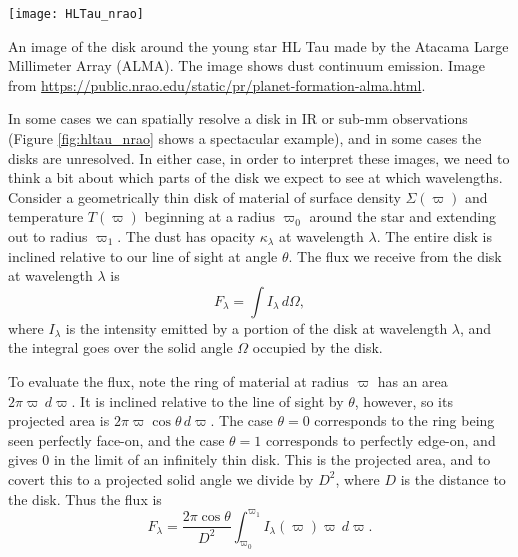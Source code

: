 \begin{marginfigure}
\texttt{[image: HLTau\_nrao]}
\caption[ALMA image of the disk around HL Tau]{
\label{fig:hltau_nrao}
An image of the disk around the young star HL Tau made by the Atacama Large Millimeter Array (ALMA). The image shows dust continuum emission. Image from \url{https://public.nrao.edu/static/pr/planet-formation-alma.html}.
}
\end{marginfigure}

In some cases we can spatially resolve a disk in IR or sub-mm observations (Figure \ref{fig:hltau_nrao} shows a spectacular example), and in some cases the disks are unresolved. In either case, in order to interpret these images, we need to think a bit about which parts of the disk we expect to see at which wavelengths. Consider a geometrically thin disk of material of surface density $\Sigma(\varpi)$ and temperature $T(\varpi)$ beginning at a radius $\varpi_0$ around the star and extending out to radius $\varpi_1$. The dust has opacity $\kappa_\lambda$ at wavelength $\lambda$. The entire disk is inclined relative to our line of sight at angle $\theta$. The flux we receive from the disk at wavelength $\lambda$ is
\begin{equation}
F_{\lambda} = \int I_{\lambda}\, d\Omega,
\end{equation}
where $I_{\lambda}$ is the intensity emitted by a portion of the disk at wavelength $\lambda$, and the integral goes over the solid angle $\Omega$ occupied by the disk.

To evaluate the flux, note the ring of material at radius $\varpi$ has an area $2\pi \varpi \,d\varpi$. It is inclined relative to the line of sight by $\theta$, however, so its projected area is $2\pi \varpi \cos\theta\, d\varpi$. The case $\theta=0$ corresponds to the ring being seen perfectly face-on, and the case $\theta=1$ corresponds to perfectly edge-on, and gives 0 in the limit of an infinitely thin disk. This is the projected area, and to covert this to a projected solid angle we divide by $D^2$, where $D$ is the distance to the disk. Thus the flux is
\begin{equation}
F_{\lambda} = \frac{2\pi \cos\theta}{D^2} \int_{\varpi_0}^{\varpi_1} I_\lambda(\varpi) \varpi\, d\varpi.
\end{equation}

